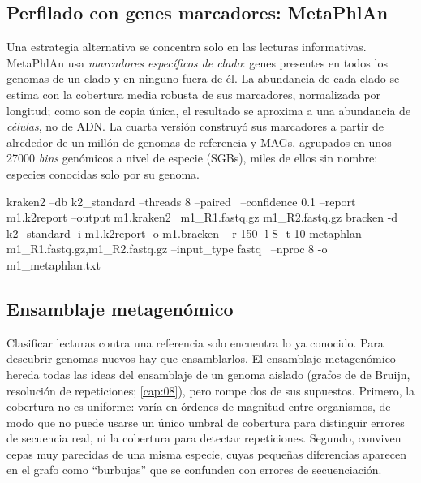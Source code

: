 \subsection{Perfilado con genes marcadores: MetaPhlAn}

Una estrategia alternativa se concentra solo en las lecturas informativas. MetaPhlAn usa \emph{marcadores específicos de clado}: genes presentes en todos los genomas de un clado y en ninguno fuera de él. La abundancia de cada clado se estima con la cobertura media robusta de sus marcadores, normalizada por longitud; como son de copia única, el resultado se aproxima a una abundancia de \emph{células}, no de ADN. La cuarta versión \parencite{c14-blancomiguez2023} construyó sus marcadores a partir de alrededor de un millón de genomas de referencia y MAGs, agrupados en unos \num{27000} \emph{bins} genómicos a nivel de especie (SGBs), miles de ellos sin nombre: especies conocidas solo por su genoma.

\begin{consola}
kraken2 --db k2_standard --threads 8 --paired \
  --confidence 0.1 --report m1.k2report --output m1.kraken2 \
  m1_R1.fastq.gz m1_R2.fastq.gz
bracken -d k2_standard -i m1.k2report -o m1.bracken \
  -r 150 -l S -t 10
metaphlan m1_R1.fastq.gz,m1_R2.fastq.gz --input_type fastq \
  --nproc 8 -o m1_metaphlan.txt
\end{consola}

\subsection{Ensamblaje metagenómico}

Clasificar lecturas contra una referencia solo encuentra lo ya conocido. Para descubrir genomas nuevos hay que ensamblarlos. El ensamblaje metagenómico hereda todas las ideas del ensamblaje de un genoma aislado (grafos de de Bruijn, resolución de repeticiones; \cref{cap:08}), pero rompe dos de sus supuestos. Primero, la cobertura no es uniforme: varía en órdenes de magnitud entre organismos, de modo que no puede usarse un único umbral de cobertura para distinguir errores de secuencia real, ni la cobertura para detectar repeticiones. Segundo, conviven cepas muy parecidas de una misma especie, cuyas pequeñas diferencias aparecen en el grafo como ``burbujas'' que se confunden con errores de secuenciación.

